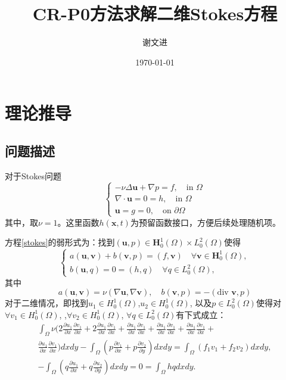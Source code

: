 \documentclass{ctexart}
\title{CR-P0方法求解二维Stokes方程}
\author{谢文进}
\date{\today}
\begin{document}
\maketitle
\section{理论推导}
\subsection{问题描述}
对于Stokes问题
\begin{equation}
    \label{stokes}
    \left\{\begin{matrix}
        - \nu \Delta \mathbf{u}  + \nabla p = f, \quad \text{in } \Omega\\ 
        \nabla \cdot \mathbf{u} = 0 = h, \quad \text{in } \Omega \\
        \mathbf{u} = g = 0, \quad \text{on } \partial \Omega
    \end{matrix}\right.
\end{equation}
其中，取$\nu = 1$。这里函数$h(\mathbf{x},t)$为预留函数接口，方便后续处理随机项。

方程\ref{stokes}的弱形式为：找到$(\mathbf{u},p) \in  \mathbf{H}_0^1{(\Omega)} \times L_0^2{(\Omega)}$使得
\begin{equation}
    \label{weakStokes}
    \left\{\begin{matrix}
        a(\mathbf{u,v})+b(\mathbf{v},p)=(f,\mathbf{v}) \quad \forall \mathbf{v}\in \mathbf{H}_0^1{(\Omega)},\\ 
        b(\mathbf{u},q) = 0 = (h,q) \quad \forall q \in  L_0^2{(\Omega)},
    \end{matrix}\right.
\end{equation}
其中
$$
a(\mathbf{u,v})=\nu(\nabla \mathbf{u},\nabla \mathbf{v}), 
\quad b(\mathbf{v},p)=-(\text{div } \mathbf{v},p)
$$
对于二维情况，即找到$u_1\in H_0^1(\Omega)$,$u_2\in H_0^1(\Omega)$,
以及$p\in L_0^2(\Omega)$使得对$\forall v_1\in H_0^1(\Omega) $,
,$\forall v_2\in H_0^1(\Omega)$, $\forall q\in L_0^2(\Omega)$有下式\cite{FEM-何晓明}成立：
\begin{gather*}
    \label{weakStokes2}
        \int_{\Omega}\nu(2\frac{\partial u_1}{\partial x}\frac{\partial v_1}{\partial x}  +
        2\frac{\partial u_1}{\partial x}\frac{\partial v_1}{\partial x} +
        \frac{\partial u_1}{\partial x}\frac{\partial v_1}{\partial x} + 
        \frac{\partial u_1}{\partial x}\frac{\partial v_1}{\partial x} + 
        \frac{\partial u_1}{\partial x}\frac{\partial v_1}{\partial x} + \\
        \frac{\partial u_1}{\partial x}\frac{\partial v_1}{\partial x})dxdy 
        - \int_{\Omega}(p\frac{\partial v_1}{\partial x}
        + p\frac{\partial v_2}{\partial y})dxdy
        = \int_{\Omega}(f_1v_1+f_2v_2)dxdy,\\ 
        - \int_{\Omega}(q\frac{\partial u_1}{\partial x}
        + q\frac{\partial u_2}{\partial y})dxdy = 0
        =\int_{\Omega}hqdxdy.
\end{gather*}
\end{document}
